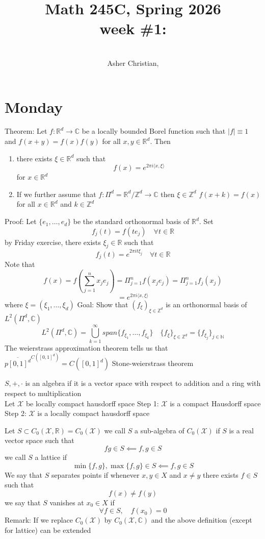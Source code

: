 \documentclass[11pt]{article}
\newcommand{\cnum}{Math 245C}
\newcommand{\ced}{Spring 2026}
\newcommand{\ctitle}[4]{\title{\vspace{-0.5in}\cnum, \ced\\week #1: #2}\author{\vspace{-0.35in}\\#3, #4}}
\begin{document}
\ctitle{\#1}{}{Asher Christian}{}
\date{}
\maketitle

\section{Monday}
Theorem: Let $f : \mathbb{R}^{d} \to \mathbb{C}$ be a  locally  bounded Borel function such that
$|f| \equiv 1$ and $f(x+y) = f(x)f(y)$ for all $x,y \in \mathbb{R}^{d}$. Then
\begin{enumerate}
    \item there exists $\xi \in \mathbb{R}^{d}$ such that
        \[
        f(x) = e^{2\pi i \langle x, \xi \rangle}
        \] 
        for $x \in \mathbb{R}^{d}$ 
    \item If we further assume that $f : \Pi^{d} = \mathbb{R}^{d} / \mathbb{Z}^{d} \to \mathbb{C}$ 
        then $\xi \in \mathbb{Z}^{d}$ $f(x+ k) = f(x) $ for all  $x \in \mathbb{R}^{d}$ and $k \in \mathbb{Z}^{d}$
\end{enumerate}
Proof:
Let $\{e_1,\dots,e_d\}$  be the standard orthonormal
basis of $ \mathbb{R}^{d}$. Set
\[
f_j(t) = f(te_j) \quad \forall t \in \mathbb{R}
\] 
by Friday exercise, there exists $\xi_j \in \mathbb{R}$ such that
\[
f_j(t) = e^{2\pi i t \xi_j} \quad \forall t \in \mathbb{R}
\] 
Note that
\[
    f(x) = f(\sum_{j=1}^{n}x_j e_j) = \Pi_{j=1}^{n} f(x_je_j) = \Pi_{j=1}^{n}f_j(x_j)
\] 
\[
 = e^{2\pi i \langle x, \xi \rangle}
\] 
where $\xi = (\xi_1,\dots,\xi_d)$
Goal: Show that $(f_{\xi})_{\xi \in \mathbb{Z}^{d}}$ is an orthonormal basis of $ L^{2}( \Pi^{d},  \mathbb{C})$
\[
    L^{2}( \Pi^{d}, \mathbb{C}) = \bigcup_{k=1}^{\infty} span\{f_{\xi_1},\dots,f_{\xi_k}\} \quad \{f_{\xi}\}_{\xi \in \mathbb{Z}^{d}} = \{f_{\xi_j}\}_{j \in \mathbb{N}}
\] 
The weierstrass approximation theorem tells us that $\overline{p[0,1]^{d}}^{C([0,1]^{d})} = C([0,1]^{d})$ 
Stone-weierstrass theorem

$S, +, \cdot$ is an algebra if it is a vector space with respect to addition and a ring with respect to multiplication\\
Let $ \mathcal{X}$ be locally compact hausdorff space
Step 1: $ \mathcal{X}$ is a compact Hausdorff space
Step 2: $ \mathcal{X}$ is a locally compact hausdorff space

Let $S \subset C_0( \mathcal{X}, \mathbb{R}) = C_0( \mathcal{X})$ we call $ S$ a sub-algebra of  $ C_{0} ( \mathcal{X})$ if
$S$ is a real vector space such that
 \[
fg \in S \impliedby f,g \in S
\] 
we call $S$ a lattice if
 \[
     \min\{f,g\}, \max\{f,g\} \in S \impliedby f,g \in S
\] 
We say that $S$ separates points if
whenever  $x,y \in X$ and  $x \ne y$ there exists  $f \in S$ such that
 \[
f(x) \ne f(y)
\] 
we say that $S$ vanishes at  $x_0 \in X$ if
\[
\forall f \in S, \quad f(x_0) = 0
\] 
Remark: If we replace $ C_0( \mathcal{X})$ by  $ C_0( \mathcal{X}, \mathbb{C})$
and the above definition (except for lattice) can be extended
\end{document}

